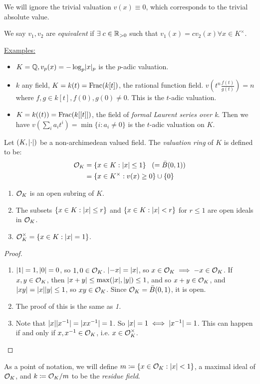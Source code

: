 \documentclass[10pt,a4paper]{article}
\begin{document}
We will ignore the trivial valuation $v(x) \equiv 0$, which corresponds to the trivial absolute value.

We say $v_1, v_2$ are \emph{equivalent} if $\exists c \in \R_{>0}$ such that $v_1(x) = cv_2(x) \forall x \in K^\times$.

\underline{Examples:}
\begin{itemize}
  \item $K = \mathbb{Q}, v_p(x) = -\log_p \lvert x\rvert_p$ is the $p$-adic valuation.
  \item $k$ any field, $K = k(t) = \operatorname{Frac}(k[t])$, the rational function field. $v\left(t^n \frac{f(t)}{g(t)}\right) =n$ where $f, g \in k[t], f(0), g(0) \neq 0$. This is the $t$-adic valuation.
  \item $K = k((t)) = \operatorname{Frac}(k[[t]])$, the field of \emph{formal Laurent series over k}. Then we have $v\left(\sum_i a_i t^i\right) = \min \{i : a_i \neq 0\}$ is the $t$-adic valuation on $K$.
\end{itemize}

\begin{definition}
  Let $(K, \lvert\cdot\rvert)$ be a non-archimedean valued field. The \emph{valuation ring} of $K$ is defined to be:
  \begin{align*}
    \mathcal{O}_K &= \{ x \in K : \lvert x\rvert \leq 1\}\;\;\; (= \bar{B}(0, 1))\\
    &= \{x \in K^\times : v(x) \geq 0\}\cup\{0\}
  \end{align*}
\end{definition}
\begin{proposition}\hspace*{0cm}
  \begin{enumerate}
    \item $\mathcal{O}_K$ is an open subring of $K$.
    \item The subsets $\{x \in K : \lvert x\rvert \leq r\}$ and $\{x \in K : \lvert x\rvert < r\}$ for $r \leq 1$ are open ideals in $\mathcal{O}_K$.
    \item $\mathcal{O}_K^\times = \{x\in K : \lvert x\rvert = 1\}$.
  \end{enumerate}
\end{proposition}
\begin{proof}\hspace*{0cm}
  \begin{enumerate}[label = \textit{\arabic*}.]
    \item $\lvert1\rvert = 1, \lvert0\rvert = 0$, so $1, 0 \in \mathcal{O}_K$. $\lvert-x\rvert = \lvert x\rvert$, so $x \in \mathcal{O}_K \implies -x \in \mathcal{O}_K$. If $x, y \in \mathcal{O}_K$, then $\lvert x+y\rvert \leq \max(\lvert x\rvert, \lvert y\rvert) \leq 1$, and so $x+y \in \mathcal{O}_K$, and $\lvert xy\rvert = \lvert x\rvert\lvert y\rvert \leq 1$, so $xy \in \mathcal{O}_K$. Since $\mathcal{O}_K = \bar{B}(0, 1)$, it is open.
    \item The proof of this is the same as \textit{1.}
    \item Note that $\lvert x\rvert\lvert x^{-1}\rvert = \lvert xx^{-1}\rvert = 1$. So $\lvert x\rvert = 1 \iff \lvert x^{-1}\rvert = 1$. This can happen if and only if $x, x^{-1} \in \mathcal{O}_K$, i.e. $x \in \mathcal{O}_K^\times$.
  \end{enumerate}
\end{proof}
As a point of notation, we will define $m \coloneqq \{x \in \mathcal{O}_K : \lvert x\rvert<1\}$, a maximal ideal of $\mathcal{O}_K$, and $k \coloneqq \mathcal{O}_K/m$ to be the \emph{residue field}.
\end{document}
